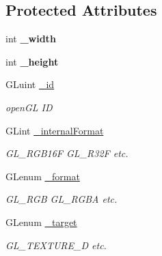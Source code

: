 \subsection*{Protected Attributes}
\begin{DoxyCompactItemize}
\item 
\hypertarget{class_texture_a41a325eee929d2aae4ecb203cae2cfcf}{}int {\bfseries \+\_\+width}\label{class_texture_a41a325eee929d2aae4ecb203cae2cfcf}

\item 
\hypertarget{class_texture_a1961677c206e2d4a8af399a33c349daf}{}int {\bfseries \+\_\+height}\label{class_texture_a1961677c206e2d4a8af399a33c349daf}

\item 
\hypertarget{class_texture_af6563b9b08f4bf2749639eb4434c9c35}{}G\+Luint \hyperlink{class_texture_af6563b9b08f4bf2749639eb4434c9c35}{\+\_\+id}\label{class_texture_af6563b9b08f4bf2749639eb4434c9c35}

\begin{DoxyCompactList}\small\item\em open\+G\+L I\+D \end{DoxyCompactList}\item 
\hypertarget{class_texture_ab4b0131aa6a35ff7a31dad24e9166135}{}G\+Lint \hyperlink{class_texture_ab4b0131aa6a35ff7a31dad24e9166135}{\+\_\+internal\+Format}\label{class_texture_ab4b0131aa6a35ff7a31dad24e9166135}

\begin{DoxyCompactList}\small\item\em G\+L\+\_\+\+R\+G\+B16\+F G\+L\+\_\+\+R32\+F etc. \end{DoxyCompactList}\item 
\hypertarget{class_texture_ac2029735134ea1a2de41a03e2e757217}{}G\+Lenum \hyperlink{class_texture_ac2029735134ea1a2de41a03e2e757217}{\+\_\+format}\label{class_texture_ac2029735134ea1a2de41a03e2e757217}

\begin{DoxyCompactList}\small\item\em G\+L\+\_\+\+R\+G\+B G\+L\+\_\+\+R\+G\+B\+A etc. \end{DoxyCompactList}\item 
\hypertarget{class_texture_a7240922837a1cfca87b1a4841f5c0b93}{}G\+Lenum \hyperlink{class_texture_a7240922837a1cfca87b1a4841f5c0b93}{\+\_\+target}\label{class_texture_a7240922837a1cfca87b1a4841f5c0b93}

\begin{DoxyCompactList}\small\item\em G\+L\+\_\+\+T\+E\+X\+T\+U\+R\+E\+\_\+D etc. \end{DoxyCompactList}\end{DoxyCompactItemize}


